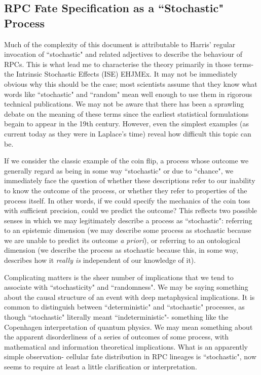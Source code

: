 \subsection{RPC Fate Specification as a ``Stochastic" Process}
\label{stochastic}

Much of the complexity of this document is attributable to Harris' regular invocation of ``stochastic" and related adjectives to describe the behaviour of RPCs. This is what lead me to characterise the theory primarily in those terms- the Intrinsic Stochastic Effects (ISE) EHJMEx. It may not be immediately obvious why this should be the case; most scientists assume that they know what words like ``stochastic" and ``random" mean well enough to use them in rigorous technical publications. We may not be aware that there has been a sprawling debate on the meaning of these terms since the earliest statistical formulations begain to appear in the 19th century. However, even the simplest examples (as current today as they were in Laplace's time) reveal how difficult this topic can be.

If we consider the classic example of the coin flip, a process whose outcome we generally regard as being in some way ``stochastic" or due to ``chance", we immediately face the question of whether these descriptions refer to our inability to know the outcome of the process, or whether they refer to properties of the process itself. In other words, if we could specify the mechanics of the coin toss with sufficient precision, could we predict the outcome? This reflects two possible senses in which we may legitimately describe a process as ``stochastic": referring to an epistemic dimension (we may describe some process as stochastic because we are unable to predict its outcome \textit{a priori}), or referring to an ontological dimension (we describe the process as stochastic because this, in some way, describes how it \textit{really is} independent of our knowledge of it).

Complicating matters is the sheer number of implications that we tend to associate with ``stochasticity" and ``randomness". We may be saying something about the causal structure of an event with deep metaphysical implications. It is common to distinguish between ``deterministic" and ``stochastic" processes, as though ``stochastic" literally meant ``indeterministic"- something like the Copenhagen interpretation of quantum physics. We may mean something about the apparent disorderliness of a series of outcomes of some process, with mathematical and information theoretical implications. What is an apparently simple observation- cellular fate distribution in RPC lineages is ``stochastic", now seems to require at least a little clarification or interpretation.

